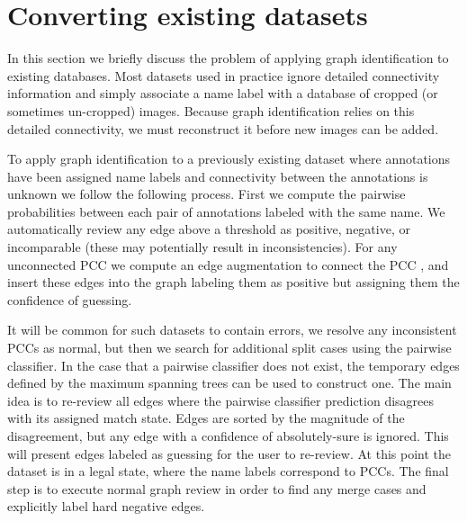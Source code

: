 


\section{Converting existing datasets}\label{sec:rename}

In this section we briefly discuss the problem of applying graph identification to existing databases. Most
datasets used in practice ignore detailed connectivity information and simply associate a name label with a
database of cropped (or sometimes un-cropped) images. Because graph identification relies on this detailed
connectivity, we must reconstruct it before new images can be added.

To apply graph identification to a previously existing dataset where annotations have been assigned name labels and
connectivity between the annotations is unknown we follow the following process. First we compute the pairwise
probabilities between each pair of annotations labeled with the same name. We automatically review any edge above a
threshold as positive, negative, or incomparable (these may potentially result in inconsistencies). For any
unconnected PCC we compute an edge augmentation to connect the PCC
\cite{eswaran_augmentation_1976,khuller_approximation_1993}, and insert these edges into the graph labeling them as
positive but assigning them the confidence of guessing.

It will be common for such datasets to contain errors, we resolve any inconsistent PCCs as normal, but then we
search for additional split cases using the pairwise classifier. In the case that a pairwise classifier does not
exist, the temporary edges defined by the maximum spanning trees can be used to construct one. The main idea is to
re-review all edges where the pairwise classifier prediction disagrees with its assigned match state. Edges are
sorted by the magnitude of the disagreement, but any edge with a confidence of absolutely-sure is ignored. This
will present edges labeled as guessing for the user to re-review. At this point the dataset is in a legal state,
where the name labels correspond to PCCs. The final step is to execute normal graph review in order to find any
merge cases and explicitly label hard negative edges.

